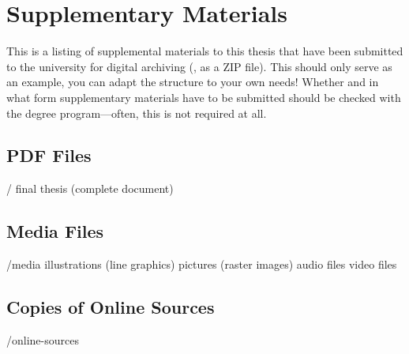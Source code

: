 \chapter{Supplementary Materials}
\label{app:Materials}


This is a listing of supplemental materials to this thesis that have been submitted
to the university for digital archiving (\eg, as a ZIP file).
This should only serve as an example, you can adapt the structure to your own needs!
Whether and in what form supplementary materials have to be submitted should be
checked with the degree program---often, this is not required at all.


\section{PDF Files}


\begin{FileList}{/}
			final thesis (complete document)
\end{FileList}

\section{Media Files}

\begin{FileList}{/media}
			illustrations (line graphics)
		pictures (raster images)
						audio files
						video files
\end{FileList}


\section{Copies of Online Sources}

\begin{FileList}{/online-sources}
	 {\backtrackerfalse\parencite{WikiReliquienschrein2023}}
\end{FileList}



